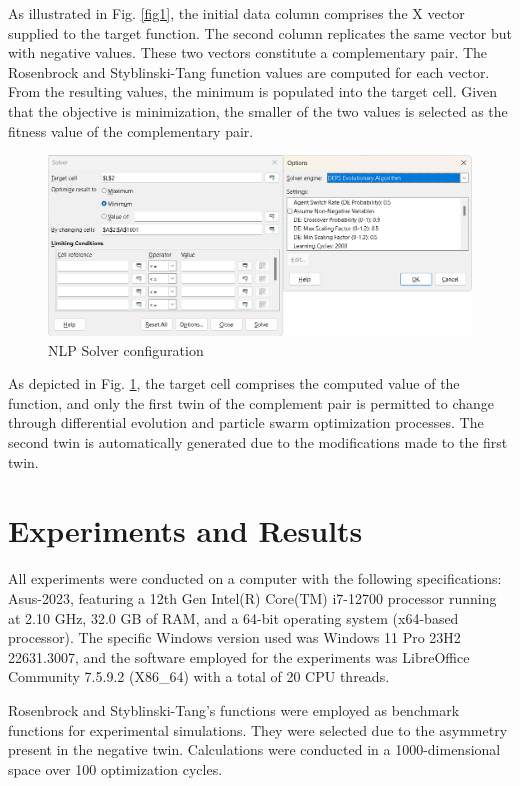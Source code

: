 \documentclass[runningheads]{llncs}
\begin{document}
As illustrated in Fig. \ref{fig1}, the initial data column comprises the X vector supplied to the target function. The second column replicates the same vector but with negative values. These two vectors constitute a complementary pair. The Rosenbrock and Styblinski-Tang function values are computed for each vector. From the resulting values, the minimum is populated into the target cell. Given that the objective is minimization, the smaller of the two values is selected as the fitness value of the complementary pair.

\begin{figure}
\includegraphics[width=\textwidth]{fig2.png}
\caption{NLP Solver configuration} \label{fig2}
\end{figure}

As depicted in Fig. \ref{fig2}, the target cell comprises the computed value of the function, and only the first twin of the complement pair is permitted to change through differential evolution and particle swarm optimization processes. The second twin is automatically generated due to the modifications made to the first twin.

\section{Experiments and Results}

All experiments were conducted on a computer with the following specifications: Asus-2023, featuring a 12th Gen Intel(R) Core(TM) i7-12700 processor running at 2.10 GHz, 32.0 GB of RAM, and a 64-bit operating system (x64-based processor). The specific Windows version used was Windows 11 Pro 23H2 22631.3007, and the software employed for the experiments was LibreOffice Community 7.5.9.2 (X86\_64) with a total of 20 CPU threads.

Rosenbrock and Styblinski-Tang's functions were employed as benchmark functions for experimental simulations. They were selected due to the asymmetry present in the negative twin. Calculations were conducted in a 1000-dimensional space over 100 optimization cycles. 
\end{document}
